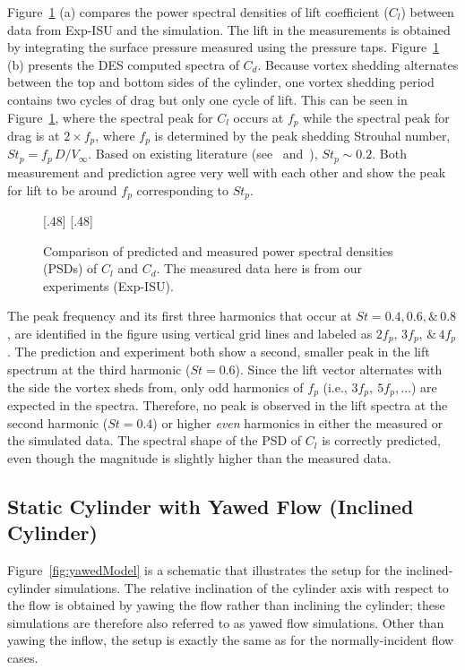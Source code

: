 Figure~\ref{fig:St_Compared_Re20k} (a) compares the power spectral densities of
lift coefficient ($C_l$) between data from Exp-ISU and the simulation. 
The lift in the measurements is obtained by integrating the surface
pressure measured using the pressure taps. Figure~\ref{fig:St_Compared_Re20k} (b)
presents the DES computed spectra of $C_d$.  Because vortex shedding alternates
between the top and bottom sides of the cylinder, one vortex shedding period contains two cycles
of drag but only one cycle of lift. This can be seen in
Figure~\ref{fig:St_Compared_Re20k}, where the spectral peak for $C_l$ occurs at
$f_p$ while the spectral peak for drag is at $2\times f_p$, where $f_p$ is determined
by the peak shedding Strouhal number, $St_p = f_p\,D/V_\infty$. Based on existing
literature (see~\cite{travin2000detached} and~\cite{norberg2013pressure}),
$St_p \sim 0.2$. Both measurement and prediction agree very well with each
other and show the peak for lift to be around $f_p$ corresponding to $St_p$.
%
\begin{figure}[htb!]
  \centering
    [.48\linewidth]{}
  \hspace*{\fill}
    [.48\linewidth]{}
    \caption{Comparison of predicted and measured power spectral densities
      (PSDs) of $C_l$ and $C_d$. The
      measured data here is from our experiments (Exp-ISU).}
\label{fig:St_Compared_Re20k}
\end{figure}

The peak frequency and its first three harmonics that occur at $St = 0.4, 0.6,
\& \,0.8$, are identified in the figure using vertical grid lines and labeled
as $2f_p,\,3f_p,\,\&\,4f_p$. The prediction and experiment both show a second,
smaller peak in the lift spectrum at the third harmonic ($St=0.6$).  Since the
lift vector alternates with the side the vortex sheds from, only odd harmonics
of $f_p$ (i.e., $3f_p,~5f_p,\ldots$) are expected in the spectra. Therefore, no
peak is observed in the lift spectra at the second harmonic ($St=0.4$) or
higher {\em even} harmonics in either the measured or the simulated data. The
spectral shape of the PSD of $C_l$ is correctly predicted, even though the
magnitude is slightly higher than the measured data.



\subsection{Static Cylinder with Yawed Flow (Inclined Cylinder)}
\label{sec:inclined_cylinder}
%
Figure~\ref{fig:yawedModel} is a schematic that illustrates the setup for the
inclined-cylinder simulations. The relative inclination of the cylinder axis
with respect to the flow is obtained by yawing the flow rather than inclining
the cylinder; these simulations are therefore also referred to as yawed flow
simulations. Other than yawing the inflow, the setup is exactly the same as for
the normally-incident flow cases.

